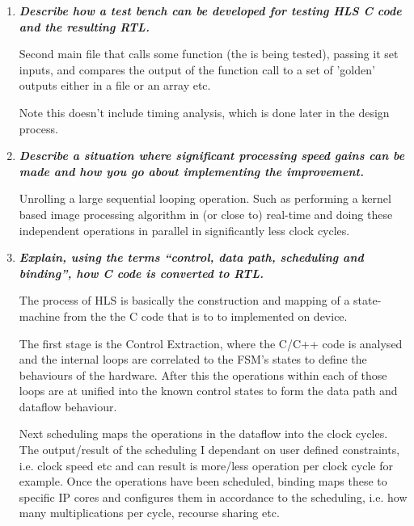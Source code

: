 \documentclass[11pt]{article}
\begin{document}
\begin{preview}
\begin{enumerate}
        \item \textit{\textbf{Describe how a test bench can be developed for testing HLS C code and the resulting RTL.}}

              Second main file that calls some function (the is being tested), passing it set inputs, and compares the output of the function call to a set of 'golden' outputs either in a file or an array etc.

              Note this doesn't include timing analysis, which is done later in the design process.

        \item \textit{\textbf{Describe a situation where significant processing speed gains can be made and how you go about implementing the improvement.}}

              Unrolling a large sequential looping operation. Such as performing a kernel based image processing algorithm in (or close to) real-time and doing these independent operations in parallel in significantly less clock cycles.

        \item \textit{\textbf{Explain, using the terms “control, data path, scheduling and binding”, how C code is converted to RTL.}}

              The process of HLS is basically the construction and mapping of a state-machine from the the C code that is to to implemented on device.

              The first stage is the Control Extraction, where the C/C++ code is analysed and the internal loops are correlated to the FSM's states to define the behaviours of the hardware. After this the operations within each of those loops are at unified into the known control states to form the data path and dataflow behaviour.

              Next scheduling maps the operations in the dataflow into the clock cycles. The output/result of the scheduling I dependant on user defined constraints, i.e. clock speed etc and can result is more/less operation per clock cycle for example.
              Once the operations have been scheduled, binding maps these to specific IP cores and configures them in accordance to the scheduling, i.e. how many multiplications per cycle, recourse sharing etc.



    \end{enumerate}

\end{preview}
\end{document}
